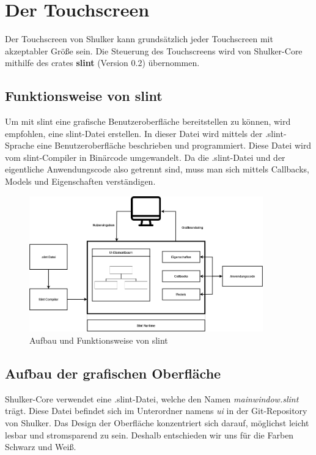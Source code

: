 \chapter{Der Touchscreen}
Der Touchscreen von Shulker kann grundsätzlich jeder Touchscreen mit akzeptabler Größe sein.
Die Steuerung des Touchscreens wird von Shulker-Core mithilfe des crates \textbf{slint} (Version 0.2) übernommen.

\section{Funktionsweise von slint}
Um mit slint eine grafische Benutzeroberfläche bereitstellen zu können, wird empfohlen, eine slint-Datei erstellen.
In dieser Datei wird mittels der .slint-Sprache eine Benutzeroberfläche beschrieben und programmiert. Diese Datei wird vom 
slint-Compiler in Binärcode umgewandelt. Da die .slint-Datei und der eigentliche Anwendungscode also getrennt sind, muss man sich
mittels Callbacks, Models und Eigenschaften verständigen.
\begin{figure}[H]
    \begin{center}
        \includegraphics[width=0.9\textwidth]{images/core/slint_aufbau.png}
        \caption{Aufbau und Funktionsweise von slint \cite{slintfunktion}}
    \end{center}
\end{figure}

\section{Aufbau der grafischen Oberfläche}
Shulker-Core verwendet eine .slint-Datei, welche den Namen \textit{mainwindow.slint} trägt. Diese Datei befindet sich im Unterordner
namens \textit{ui} in der Git-Repository von Shulker. Das Design der Oberfläche konzentriert sich darauf, möglichst leicht
lesbar und stromsparend zu sein. Deshalb entschieden wir uns für die Farben Schwarz und Weiß.

